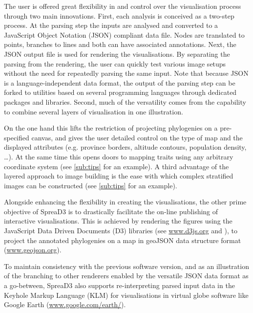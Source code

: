 \documentclass[english]{paper}
\def \spreadname {SpreaD3}
\begin{document}
\par
The user is offered great flexibility in and control over the visualisation process through two main innovations.
First, each analysis is conceived as a two-step process. 
At the parsing step the inputs are 
analysed and converted to a JavaScript Object Notation (JSON) compliant data file.
Nodes are translated to points, branches to lines and both can have associated annotations. 
Next, the JSON 
output file is used for rendering the visualisations.
By separating the parsing from the rendering, the user can quickly test various image setups without the need for repeatedly parsing the same input.
Note that because JSON is a language-independent data format, the output of the parsing step can be forked to utilities based on several programming languages through dedicated packages and libraries. %
Second, much of the 
versatility 
comes from the 
capability to combine several layers of visualisation in one illustration. 

On the one hand this lifts the restriction of projecting phylogenies on a pre-specified canvas, and gives the user detailed control on the type of map and the displayed %
attributes (e.g. province borders, altitude contours, population density, \dots). %
At the same time this opens doors to mapping traits using any arbitrary coordinate system (see \ref{sub:tips} for an example). 
A third advantage of the layered approach to image building is the ease with which complex stratified images can be constructed (see \ref{sub:tips} for an example). 

\par
Alongside enhancing the flexibility in creating the visualisations, the other prime objective of {\spreadname} is to drastically facilitate the on-line publishing of interactive visualisations.
This is achieved by rendering the figures using the JavaScript Data Driven Documents (D3) libraries (see \url{www.d3js.org} and \citet{Bostock:2011aa}), to project the annotated phylogenies on a map in geoJSON data structure format (\url{www.geojson.org}).

To maintain consistency with the previous software version, and as an illustration of the branching to other renderers enabled by the versatile JSON data format as a go-between, {\spreadname} also supports re-interpreting parsed input data in the Keyhole Markup Language (KLM) for visualisations in virtual globe software like Google Earth (\url{www.google.com/earth/}). 
\end{document}
